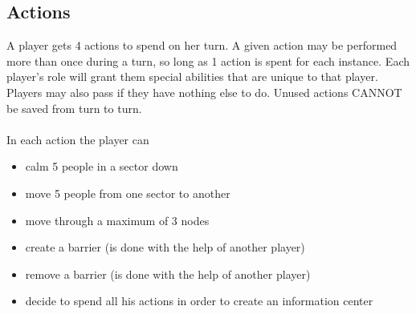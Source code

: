 \subsection*{Actions}
A player gets 4 actions to spend on her turn. A given action may be performed more than once during a turn, so long as 1 action is spent for each instance. Each player’s role will grant them special abilities that are unique to that player. Players may also pass if they have nothing else to do. Unused actions CANNOT be saved from turn to turn.\\
\\
In each action the player can
\begin{itemize}
	\item calm 5 people in a sector down
	\item move 5 people from one sector to another
	\item move through a maximum of 3 nodes
	\item create a barrier (is done with the help of another player)	
	\item remove a barrier (is done with the help of another player) 	
	\item decide to spend all his actions in order to create an information center
\end{itemize}
%
%
